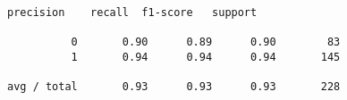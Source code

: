 \documentclass[11pt]{article}
\begin{document}
    \begin{Verbatim}[commandchars=\\\{\}]
             precision    recall  f1-score   support

          0       0.90      0.89      0.90        83
          1       0.94      0.94      0.94       145

avg / total       0.93      0.93      0.93       228


    \end{Verbatim}


    
    
    
    
\end{document}
